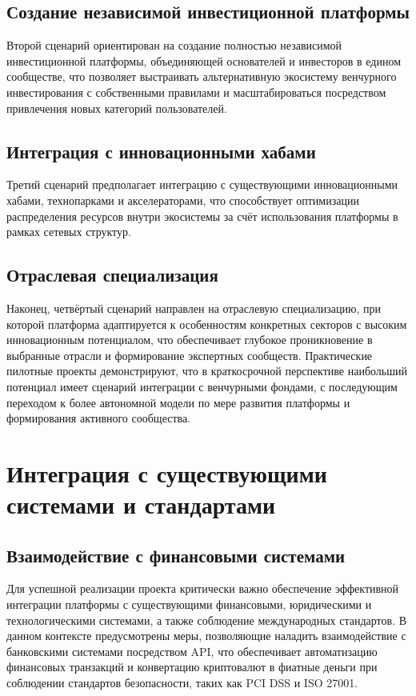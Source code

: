 \documentclass[
    candidate, %
    subf, %
    dotsinheaders=false,
]{disser}
\begin{document}
\subsection{Создание независимой инвестиционной платформы}
Второй сценарий ориентирован на создание полностью независимой инвестиционной платформы, объединяющей основателей и инвесторов в едином сообществе, что позволяет выстраивать альтернативную экосистему венчурного инвестирования с собственными правилами и масштабироваться посредством привлечения новых категорий пользователей.

\subsection{Интеграция с инновационными хабами}
Третий сценарий предполагает интеграцию с существующими инновационными хабами, технопарками и акселераторами, что способствует оптимизации распределения ресурсов внутри экосистемы за счёт использования платформы в рамках сетевых структур.

\subsection{Отраслевая специализация}
Наконец, четвёртый сценарий направлен на отраслевую специализацию, при которой платформа адаптируется к особенностям конкретных секторов с высоким инновационным потенциалом, что обеспечивает глубокое проникновение в выбранные отрасли и формирование экспертных сообществ. Практические пилотные проекты демонстрируют, что в краткосрочной перспективе наибольший потенциал имеет сценарий интеграции с венчурными фондами, с последующим переходом к более автономной модели по мере развития платформы и формирования активного сообщества.

\section{Интеграция с существующими системами и стандартами}

\subsection{Взаимодействие с финансовыми системами}
Для успешной реализации проекта критически важно обеспечение эффективной интеграции платформы с существующими финансовыми, юридическими и технологическими системами, а также соблюдение международных стандартов. В данном контексте предусмотрены меры, позволяющие наладить взаимодействие с банковскими системами посредством API, что обеспечивает автоматизацию финансовых транзакций и конвертацию криптовалют в фиатные деньги при соблюдении стандартов безопасности, таких как PCI DSS и ISO 27001.
\end{document}
